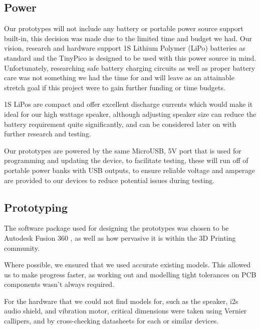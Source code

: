         
                \subsection{Power}
                \label{subsec: Power}
                    Our prototypes will not include any battery or portable power source support built-in, this decision was made due to the limited time and budget we had. Our vision, research and hardware support 1S Lithium Polymer (LiPo) batteries as standard and the TinyPico is designed to be used with this power source in mind. Unfortunately, researching safe battery charging circuits as well as proper battery care was not something we had the time for and will leave as an attainable stretch goal if this project were to gain further funding or time budgets.
        
                    1S LiPos are compact and offer excellent discharge currents which would make it ideal for our high wattage speaker, although adjusting speaker size can reduce the battery requirement quite significantly, and can be considered later on with further research and testing.
        
                    Our prototypes are powered by the same MicroUSB, 5V port that is used for programming and updating the device, to facilitate testing, these will run off of portable power banks with USB outputs, to ensure reliable voltage and amperage are provided to our devices to reduce potential issues during testing.
        
                \subsection{Prototyping}
                \label{subsec: Prototyping}
                
                    The software package used for designing the prototypes was chosen to be Autodesk Fusion 360 \cite{autodesk_2021}, as well as how pervasive it is within the 3D Printing community.
        
                    Where possible, we ensured that we used accurate existing models. This allowed us to make progress faster, as working out and modelling tight tolerances on PCB components wasn't always required. 
        
                    For the hardware that we could not find models for, such as the speaker, i2s audio shield, and vibration motor, critical dimensions were taken using Vernier callipers, and by cross-checking datasheets for each or similar devices.
        
